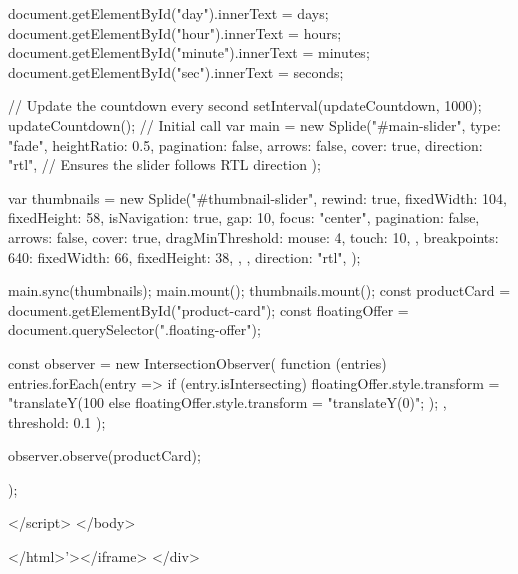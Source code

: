 {{          document.getElementById("day").innerText = days;
          document.getElementById("hour").innerText = hours;
          document.getElementById("minute").innerText = minutes;
          document.getElementById("sec").innerText = seconds;
        }

        // Update the countdown every second
        setInterval(updateCountdown, 1000);
        updateCountdown(); // Initial call
        var main = new Splide("#main-slider", {
          type: "fade",
          heightRatio: 0.5,
          pagination: false,
          arrows: false,
          cover: true,
          direction: "rtl", // Ensures the slider follows RTL direction
        });

        var thumbnails = new Splide("#thumbnail-slider", {
          rewind: true,
          fixedWidth: 104,
          fixedHeight: 58,
          isNavigation: true,
          gap: 10,
          focus: "center",
          pagination: false,
          arrows: false,
          cover: true,
          dragMinThreshold: {
            mouse: 4,
            touch: 10,
          },
          breakpoints: {
            640: {
              fixedWidth: 66,
              fixedHeight: 38,
            },
          },
          direction: "rtl",
        });

        main.sync(thumbnails);
        main.mount();
        thumbnails.mount();
        const productCard = document.getElementById("product-card");
        const floatingOffer = document.querySelector(".floating-offer");

        const observer = new IntersectionObserver(
          function (entries) {
            entries.forEach(entry => {
              if (entry.isIntersecting) {
                floatingOffer.style.transform = "translateY(100%
              } else {
                floatingOffer.style.transform = "translateY(0)";
              }
            });
          },
          { threshold: 0.1 }
        );

        observer.observe(productCard);
      });

    </script>
  </body>

</html>'></iframe>
</div>